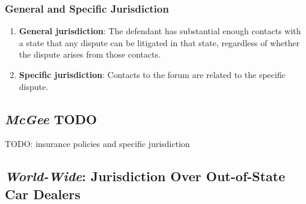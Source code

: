 \subsubsection{General and Specific Jurisdiction}

\begin{enumerate}
    \item \textbf{General jurisdiction}: The defendant has substantial enough contacts with a state that any dispute can be litigated in that state, regardless of whether the dispute arises from those contacts.
    \item \textbf{Specific jurisdiction}: Contacts to the forum are related to the specific dispute.
\end{enumerate}

\subsection{\emph{McGee} TODO}

TODO: insurance policies and specific jurisdiction

\subsection{\emph{World-Wide}: Jurisdiction Over Out-of-State Car Dealers}

